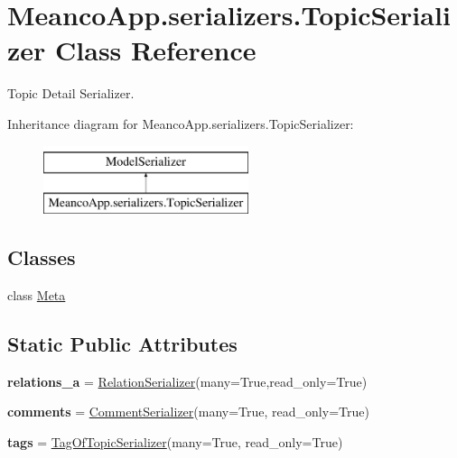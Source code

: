 \hypertarget{class_meanco_app_1_1serializers_1_1_topic_serializer}{}\section{Meanco\+App.\+serializers.\+Topic\+Serializer Class Reference}
\label{class_meanco_app_1_1serializers_1_1_topic_serializer}


Topic Detail Serializer.  


Inheritance diagram for Meanco\+App.\+serializers.\+Topic\+Serializer\+:\begin{figure}[H]
\begin{center}
\leavevmode
\includegraphics[height=2.000000cm]{class_meanco_app_1_1serializers_1_1_topic_serializer}
\end{center}
\end{figure}
\subsection*{Classes}
\begin{DoxyCompactItemize}
\item 
class \hyperlink{class_meanco_app_1_1serializers_1_1_topic_serializer_1_1_meta}{Meta}
\end{DoxyCompactItemize}
\subsection*{Static Public Attributes}
\begin{DoxyCompactItemize}
\item 
\hypertarget{class_meanco_app_1_1serializers_1_1_topic_serializer_a5076c2cfab8cc5fcb68f9907be4191de}{}\label{class_meanco_app_1_1serializers_1_1_topic_serializer_a5076c2cfab8cc5fcb68f9907be4191de} 
{\bfseries relations\+\_\+a} = \hyperlink{class_meanco_app_1_1serializers_1_1_relation_serializer}{Relation\+Serializer}(many=True,read\+\_\+only=True)
\item 
\hypertarget{class_meanco_app_1_1serializers_1_1_topic_serializer_a15d10d9c8f807070efd1bc25e6eef52d}{}\label{class_meanco_app_1_1serializers_1_1_topic_serializer_a15d10d9c8f807070efd1bc25e6eef52d} 
{\bfseries comments} = \hyperlink{class_meanco_app_1_1serializers_1_1_comment_serializer}{Comment\+Serializer}(many=True, read\+\_\+only=True)
\item 
\hypertarget{class_meanco_app_1_1serializers_1_1_topic_serializer_af76244812772272880e1682fc9844072}{}\label{class_meanco_app_1_1serializers_1_1_topic_serializer_af76244812772272880e1682fc9844072} 
{\bfseries tags} = \hyperlink{class_meanco_app_1_1serializers_1_1_tag_of_topic_serializer}{Tag\+Of\+Topic\+Serializer}(many=True, read\+\_\+only=True)
\end{DoxyCompactItemize}


